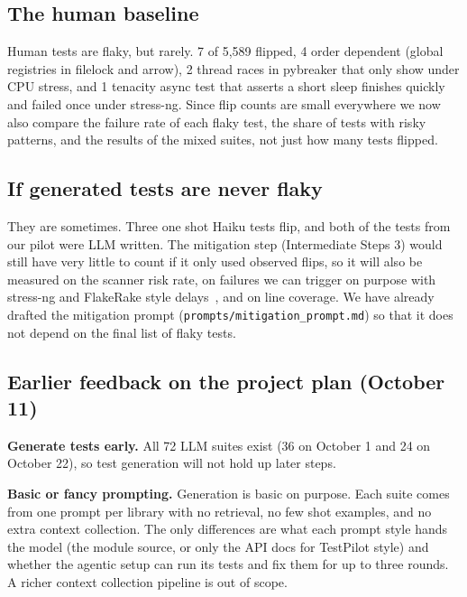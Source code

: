 \documentclass[sigconf,nonacm]{acmart}
\begin{document}
\subsection{The human baseline}
Human tests are flaky, but rarely. 7 of 5,589 flipped, 4 order dependent (global registries in filelock and arrow), 2 thread races in pybreaker that only show under CPU stress, and 1 tenacity async test that asserts a short sleep finishes quickly and failed once under stress-ng. Since flip counts are small everywhere we now also compare the failure rate of each flaky test, the share of tests with risky patterns, and the results of the mixed suites, not just how many tests flipped.

\subsection{If generated tests are never flaky}
They are sometimes. Three one shot Haiku tests flip, and both of the tests from our pilot were LLM written. The mitigation step (Intermediate Steps 3) would still have very little to count if it only used observed flips, so it will also be measured on the scanner risk rate, on failures we can trigger on purpose with stress-ng and FlakeRake style delays~\cite{rahman2024}, and on line coverage. We have already drafted the mitigation prompt (\texttt{prompts/mitigation\_prompt.md}) so that it does not depend on the final list of flaky tests.


\subsection{Earlier feedback on the project plan (October 11)}
\label{sec:oct11}
\textbf{Generate tests early.} All 72 LLM suites exist (36 on October 1 and 24 on October 22), so test generation will not hold up later steps.

\textbf{Basic or fancy prompting.} Generation is basic on purpose. Each suite comes from one prompt per library with no retrieval, no few shot examples, and no extra context collection. The only differences are what each prompt style hands the model (the module source, or only the API docs for TestPilot style) and whether the agentic setup can run its tests and fix them for up to three rounds. A richer context collection pipeline is out of scope.
\end{document}
